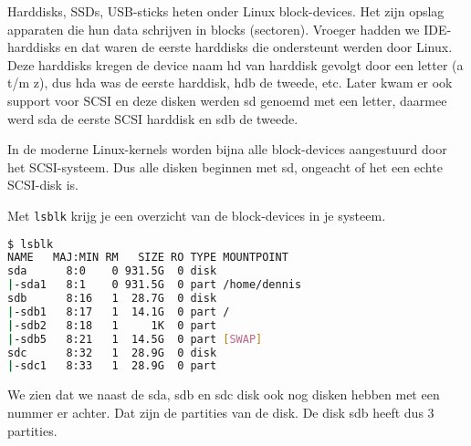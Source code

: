 Harddisks, SSDs, USB-sticks heten onder Linux block-devices. Het zijn opslag apparaten die hun data schrijven in blocks (sectoren). Vroeger hadden we IDE-harddisks en dat waren de eerste harddisks die ondersteunt werden door Linux. Deze harddisks kregen de device naam hd van harddisk gevolgt door een letter (a t/m z), dus hda was de eerste harddisk, hdb de tweede, etc. Later kwam er ook support voor SCSI en deze disken werden sd genoemd met een letter, daarmee werd sda de eerste SCSI harddisk en sdb de tweede.

In de moderne Linux-kernels worden bijna alle block-devices aangestuurd door het SCSI-systeem. Dus alle disken beginnen met sd, ongeacht of het een echte SCSI-disk is.

Met \texttt{lsblk} krijg je een overzicht van de block-devices in je systeem.
\begin{lstlisting}[language=bash]
$ lsblk
NAME   MAJ:MIN RM   SIZE RO TYPE MOUNTPOINT
sda      8:0    0 931.5G  0 disk 
|-sda1   8:1    0 931.5G  0 part /home/dennis
sdb      8:16   1  28.7G  0 disk 
|-sdb1   8:17   1  14.1G  0 part /
|-sdb2   8:18   1     1K  0 part 
|-sdb5   8:21   1  14.5G  0 part [SWAP]
sdc      8:32   1  28.9G  0 disk 
|-sdc1   8:33   1  28.9G  0 part
\end{lstlisting}
We zien dat we naast de sda, sdb en sdc disk ook nog disken hebben met een nummer er achter. Dat zijn de partities van de disk. De disk sdb heeft dus 3 partities.

